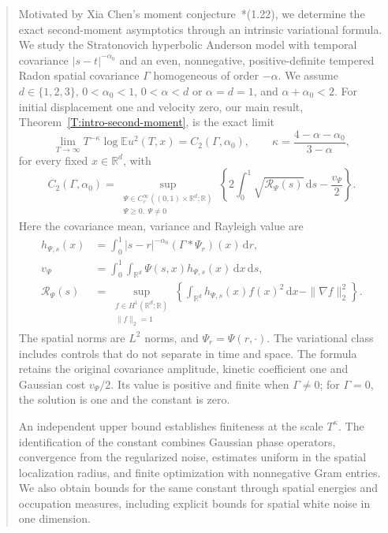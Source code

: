 \documentclass[12pt,oneside,openany]{book}
\numberwithin{equation}{section}
\theoremstyle{nogostyle}
\theoremstyle{definition}
\newcommand{\R}{\mathbb{R}}
\newcommand{\E}{\mathbb{E}}
\newcommand{\ud}{\,\mathrm{d}}
\begin{document}
\begin{abstract}
  Motivated by Xia Chen's moment
  conjecture~\cite{chen:author2026:time-dependency}*{(1.22)}, we determine the
  exact second-moment asymptotics through an intrinsic variational formula.
  We study the Stratonovich hyperbolic Anderson model with temporal covariance
  $|s-t|^{-\alpha_0}$ and an even, nonnegative, positive-definite tempered
  Radon spatial covariance $\Gamma$ homogeneous of order $-\alpha$. We assume
  $d\in\{1,2,3\}$, $0<\alpha_0<1$, $0<\alpha<d$ or $\alpha=d=1$, and
  $\alpha+\alpha_0<2$. For initial displacement one and velocity zero, our
  main result, Theorem~\ref{T:intro-second-moment}, is the exact limit
  \[
    \lim_{T\to\infty}T^{-\kappa}\log\E u^2(T,x)
    =C_2(\Gamma,\alpha_0),
    \qquad \kappa=\frac{4-\alpha-\alpha_0}{3-\alpha},
  \]
  for every fixed $x\in\R^d$, with
  \[
    C_2(\Gamma,\alpha_0)
    =\sup_{\substack{\Psi\in C_c^\infty((0,1)\times\R^d;\R)\\
    \Psi\ge0,\ \Psi\ne0}}
    \left\{2\int_0^1\sqrt{\mathcal{R}_\Psi(s)}\ud s
    -\frac{v_\Psi}{2}\right\}.
  \]
  Here the covariance mean, variance and Rayleigh value are
  \[
    \begin{aligned}
      h_{\Psi,s}(x)
      &=\int_0^1|s-r|^{-\alpha_0}(\Gamma*\Psi_r)(x)\ud r,\\
      v_\Psi&=\int_0^1\int_{\R^d}\Psi(s,x)h_{\Psi,s}(x)\ud x\ud s,\\
      \mathcal{R}_\Psi(s)
      &=\sup_{\substack{f\in H^1(\R^d;\R)\\\|f\|_2=1}}
      \left\{\int_{\R^d}h_{\Psi,s}(x)f(x)^2\ud x
      -\|\nabla f\|_2^2\right\}.
    \end{aligned}
  \]
  The spatial norms are $L^2$ norms, and $\Psi_r=\Psi(r,\cdot)$. The
  variational class includes controls that do not separate in time and space.
  The formula retains the original covariance amplitude, kinetic coefficient
  one and Gaussian cost $v_\Psi/2$. Its value is positive and finite when
  $\Gamma\ne0$; for $\Gamma=0$, the solution is one and the constant is zero.

  An independent upper bound establishes finiteness at the scale $T^\kappa$.
  The identification of the constant combines Gaussian phase operators,
  convergence from the regularized noise, estimates uniform in the spatial
  localization radius, and finite optimization with nonnegative Gram entries.
  We also obtain bounds for the same constant through spatial energies and
  occupation measures, including explicit bounds for spatial white noise in
  one dimension.
\end{abstract}
\end{document}
